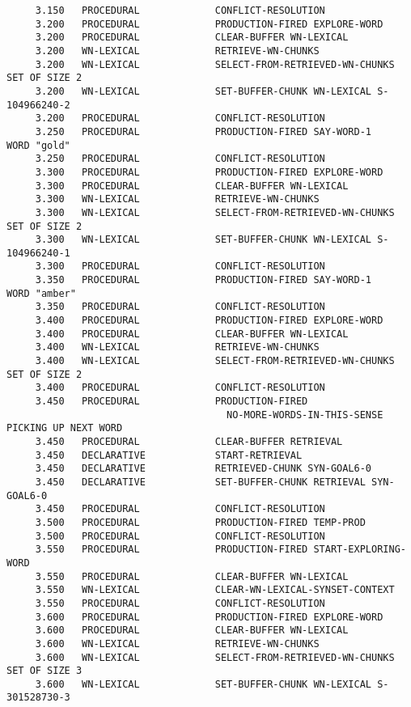 \begin{verbatim}
     3.150   PROCEDURAL             CONFLICT-RESOLUTION 
     3.200   PROCEDURAL             PRODUCTION-FIRED EXPLORE-WORD 
     3.200   PROCEDURAL             CLEAR-BUFFER WN-LEXICAL 
     3.200   WN-LEXICAL             RETRIEVE-WN-CHUNKS 
     3.200   WN-LEXICAL             SELECT-FROM-RETRIEVED-WN-CHUNKS SET OF SIZE 2 
     3.200   WN-LEXICAL             SET-BUFFER-CHUNK WN-LEXICAL S-104966240-2 
     3.200   PROCEDURAL             CONFLICT-RESOLUTION 
     3.250   PROCEDURAL             PRODUCTION-FIRED SAY-WORD-1 
WORD "gold" 
     3.250   PROCEDURAL             CONFLICT-RESOLUTION 
     3.300   PROCEDURAL             PRODUCTION-FIRED EXPLORE-WORD 
     3.300   PROCEDURAL             CLEAR-BUFFER WN-LEXICAL 
     3.300   WN-LEXICAL             RETRIEVE-WN-CHUNKS 
     3.300   WN-LEXICAL             SELECT-FROM-RETRIEVED-WN-CHUNKS SET OF SIZE 2 
     3.300   WN-LEXICAL             SET-BUFFER-CHUNK WN-LEXICAL S-104966240-1 
     3.300   PROCEDURAL             CONFLICT-RESOLUTION 
     3.350   PROCEDURAL             PRODUCTION-FIRED SAY-WORD-1 
WORD "amber" 
     3.350   PROCEDURAL             CONFLICT-RESOLUTION 
     3.400   PROCEDURAL             PRODUCTION-FIRED EXPLORE-WORD 
     3.400   PROCEDURAL             CLEAR-BUFFER WN-LEXICAL 
     3.400   WN-LEXICAL             RETRIEVE-WN-CHUNKS 
     3.400   WN-LEXICAL             SELECT-FROM-RETRIEVED-WN-CHUNKS SET OF SIZE 2 
     3.400   PROCEDURAL             CONFLICT-RESOLUTION 
     3.450   PROCEDURAL             PRODUCTION-FIRED 
                                      NO-MORE-WORDS-IN-THIS-SENSE 
PICKING UP NEXT WORD 
     3.450   PROCEDURAL             CLEAR-BUFFER RETRIEVAL 
     3.450   DECLARATIVE            START-RETRIEVAL 
     3.450   DECLARATIVE            RETRIEVED-CHUNK SYN-GOAL6-0 
     3.450   DECLARATIVE            SET-BUFFER-CHUNK RETRIEVAL SYN-GOAL6-0 
     3.450   PROCEDURAL             CONFLICT-RESOLUTION 
     3.500   PROCEDURAL             PRODUCTION-FIRED TEMP-PROD 
     3.500   PROCEDURAL             CONFLICT-RESOLUTION 
     3.550   PROCEDURAL             PRODUCTION-FIRED START-EXPLORING-WORD 
     3.550   PROCEDURAL             CLEAR-BUFFER WN-LEXICAL 
     3.550   WN-LEXICAL             CLEAR-WN-LEXICAL-SYNSET-CONTEXT 
     3.550   PROCEDURAL             CONFLICT-RESOLUTION 
     3.600   PROCEDURAL             PRODUCTION-FIRED EXPLORE-WORD 
     3.600   PROCEDURAL             CLEAR-BUFFER WN-LEXICAL 
     3.600   WN-LEXICAL             RETRIEVE-WN-CHUNKS 
     3.600   WN-LEXICAL             SELECT-FROM-RETRIEVED-WN-CHUNKS SET OF SIZE 3 
     3.600   WN-LEXICAL             SET-BUFFER-CHUNK WN-LEXICAL S-301528730-3 

\end{verbatim}
